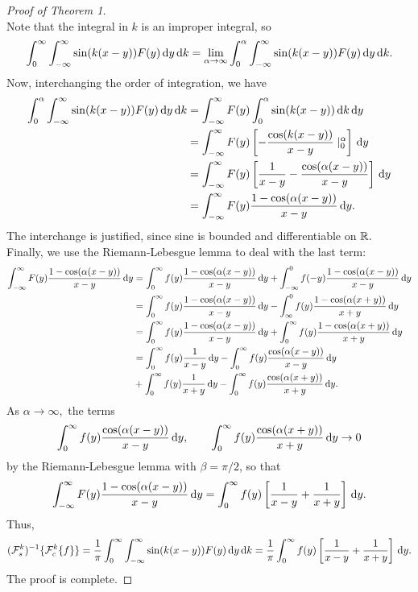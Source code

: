 \documentclass[10pt,reqno,oneside,a4paper, landscape]{article}
\begin{document}
\begin{proof}[Proof of Theorem 1]
\[\]
Note that the integral in $k$ is an improper integral, so
\[
\int^{\infty}_0 \int_{-\infty}^\infty \sin(k(x-y)) F(y) \,\mathrm{d} y \,\mathrm{d} k = \lim_{\alpha \to \infty} \int^{\alpha}_0 \int_{-\infty}^\infty \sin(k(x-y)) F(y) \,\mathrm{d} y \,\mathrm{d} k.
\]
Now, interchanging the order of integration, we have 
\begin{align*}
\int^{\alpha}_0 \int_{-\infty}^\infty \sin(k(x-y)) F(y) \,\mathrm{d} y \,\mathrm{d} k &= \int_{-\infty}^\infty F(y) \int^{\alpha}_0  \sin(k(x-y)) \,\mathrm{d} k  \,\mathrm{d} y \\
&= \int_{-\infty}^\infty F(y) \left[ - \frac{\cos(k(x-y))}{x-y} \mid^\alpha_0 \right] \,\mathrm{d} y \\
&= \int_{-\infty}^\infty F(y) \left[ \frac{1}{x-y} - \frac{\cos(\alpha(x-y))}{x-y} \right] \,\mathrm{d} y \\
&= \int_{-\infty}^\infty F(y)  \frac{1 - \cos(\alpha(x-y))}{x-y} \,\mathrm{d} y.
\end{align*}
The interchange is justified, since sine is bounded and differentiable on $\mathbb R.$ Finally, we use the Riemann-Lebesgue lemma to deal with the last term:
\begin{align*}
\int_{-\infty}^\infty F(y)  \frac{1 - \cos(\alpha(x-y))}{x-y} \,\mathrm{d} y &= \int_0^\infty f(y)  \frac{1 - \cos(\alpha(x-y))}{x-y} \,\mathrm{d} y + \int_{-\infty}^0 f(-y)  \frac{1 - \cos(\alpha(x-y))}{x-y} \,\mathrm{d} y \\
&= \int_0^\infty f(y)  \frac{1 - \cos(\alpha(x-y))}{x-y} \,\mathrm{d} y - \int_{\infty}^0 f(y)  \frac{1 - \cos(\alpha(x+y))}{x+y} \,\mathrm{d} y \\
&= \int_0^\infty f(y)  \frac{1 - \cos(\alpha(x-y))}{x-y} \,\mathrm{d} y + \int^{\infty}_0 f(y)  \frac{1 - \cos(\alpha(x+y))}{x+y} \,\mathrm{d} y \\ 
&= \int_0^\infty f(y)  \frac{1}{x-y} \,\mathrm{d} y - \int_0^\infty f(y) \frac{\cos(\alpha(x-y))}{x-y} \,\mathrm{d} y \\
&+ \int^{\infty}_0 f(y) \frac{1}{x+y} \,\mathrm{d} y - \int^{\infty}_0 f(y) \frac{\cos(\alpha(x+y))}{x+y} \,\mathrm{d} y.
\end{align*}
As $\alpha \to \infty,$ the terms 
\[ \int_0^\infty f(y) \frac{\cos(\alpha(x-y))}{x-y} \,\mathrm{d} y, \qquad \int^{\infty}_0 f(y) \frac{\cos(\alpha(x+y))}{x+y} \,\mathrm{d} y \to 0\]
by the Riemann-Lebesgue lemma with $\beta = \pi/2$, so that 
\[ 
\int_{-\infty}^\infty F(y) \frac{1 - \cos(\alpha(x-y))}{x-y} \,\mathrm{d} y = \int_0^\infty f(y) \left[ \frac{1}{x-y} + \frac{1}{x+y} \right] \,\mathrm{d} y. 
\]
Thus, 
\[ (\mathcal{F}^k_s)^{-1} \{ \mathcal{F}^k_c \{ f \} \} = \frac{1}{\pi} \int^{\infty}_0 \int_{-\infty}^\infty \sin(k(x-y)) F(y) \,\mathrm{d} y \,\mathrm{d} k = \frac{1}{\pi} \int_0^\infty f(y) \left[ \frac{1}{x-y} + \frac{1}{x+y} \right] \,\mathrm{d} y. \]
The proof is complete.
\end{proof}
\end{document}
